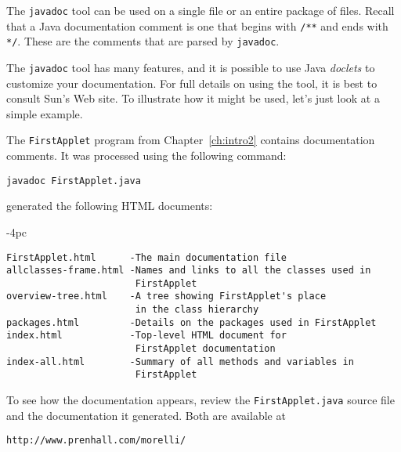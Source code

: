 The {\tt javadoc} tool can be used on a single file or an entire package
of files.  Recall that a Java documentation comment is one that begins
with \verb|/**| and ends with \verb|*/|.  These are the comments that
are parsed by {\tt javadoc}.

The {\tt javadoc} tool has many features, and it is possible to use
Java {\it doclets} to customize your documentation.  For full details
on using the tool, it is best to consult Sun's Web site.  To illustrate
how it might be used, let's just look at a simple example.

The {\tt FirstApplet} program from Chapter~\ref{ch:intro2}
contains documentation comments.  It was processed using the
following command:

\begin{jjjlisting}
\begin{lstlisting}
javadoc FirstApplet.java
\end{lstlisting}
\end{jjjlisting}

 generated the following HTML documents:

\begin{jjjlistingleft}[30pc]{-4pc}
\begin{lstlisting}[stringstyle=\color{black}]
FirstApplet.html      -The main documentation file
allclasses-frame.html -Names and links to all the classes used in 
                       FirstApplet
overview-tree.html    -A tree showing FirstApplet's place 
                       in the class hierarchy
packages.html         -Details on the packages used in FirstApplet
index.html            -Top-level HTML document for 
                       FirstApplet documentation
index-all.html        -Summary of all methods and variables in
                       FirstApplet
\end{lstlisting}
\end{jjjlistingleft}

\noindent To see how the documentation appears, review the {\tt FirstApplet.java}
source file and the documentation it generated.  Both are available at

\begin{jjjlisting}
\begin{lstlisting}[commentstyle=\color{black}]
http://www.prenhall.com/morelli/
\end{lstlisting}
\end{jjjlisting}



%
